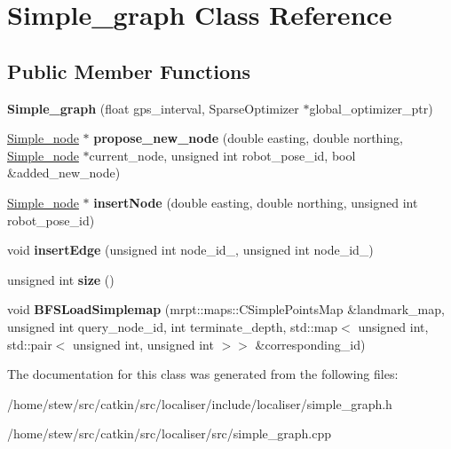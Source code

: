 \hypertarget{classSimple__graph}{}\section{Simple\+\_\+graph Class Reference}
\label{classSimple__graph}
\subsection*{Public Member Functions}
\begin{DoxyCompactItemize}
\item 
\mbox{\label{classSimple__graph_a62344f211bd74de6ff43d9a58f0dd60c}} 
{\bfseries Simple\+\_\+graph} (float gps\+\_\+interval, Sparse\+Optimizer $\ast$global\+\_\+optimizer\+\_\+ptr)
\item 
\mbox{\label{classSimple__graph_ae152a92b73c6a25c23d43e3e883806ec}} 
\hyperlink{structSimple__node}{Simple\+\_\+node} $\ast$ {\bfseries propose\+\_\+new\+\_\+node} (double easting, double northing, \hyperlink{structSimple__node}{Simple\+\_\+node} $\ast$current\+\_\+node, unsigned int robot\+\_\+pose\+\_\+id, bool \&added\+\_\+new\+\_\+node)
\item 
\mbox{\label{classSimple__graph_aa0f34774a8e313ab1f8cf15a6e8bd2be}} 
\hyperlink{structSimple__node}{Simple\+\_\+node} $\ast$ {\bfseries insert\+Node} (double easting, double northing, unsigned int robot\+\_\+pose\+\_\+id)
\item 
\mbox{\label{classSimple__graph_ad056ec6e053c97da0d476181a51dfaaf}} 
void {\bfseries insert\+Edge} (unsigned int node\+\_\+id\+\_, unsigned int node\+\_\+id\+\_)
\item 
\mbox{\label{classSimple__graph_a20b92b58d524ee4c1dd4a8cb02378e3a}} 
unsigned int {\bfseries size} ()
\item 
\mbox{\label{classSimple__graph_a7aad6c39497e7e5afde5a5e55a518c8a}} 
void {\bfseries B\+F\+S\+Load\+Simplemap} (mrpt\+::maps\+::\+C\+Simple\+Points\+Map \&landmark\+\_\+map, unsigned int query\+\_\+node\+\_\+id, int terminate\+\_\+depth, std\+::map$<$ unsigned int, std\+::pair$<$ unsigned int, unsigned int $>$$>$ \&corresponding\+\_\+id)
\end{DoxyCompactItemize}


The documentation for this class was generated from the following files\+:\begin{DoxyCompactItemize}
\item 
/home/stew/src/catkin/src/localiser/include/localiser/simple\+\_\+graph.\+h\item 
/home/stew/src/catkin/src/localiser/src/simple\+\_\+graph.\+cpp\end{DoxyCompactItemize}
